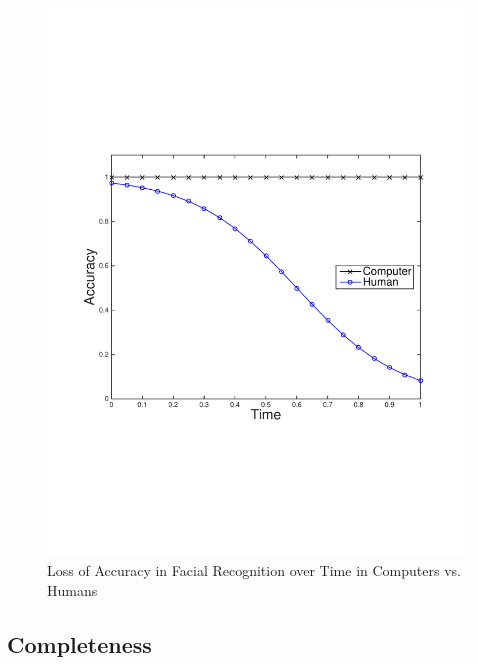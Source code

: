 \begin{figure}
\begin{centering}
    \includegraphics[clip=true, trim = 15mm 65mm 25mm 70mm, scale=0.40]{figures/example_qoi_trends/acc_vs_time_hvc_FR.pdf}
    \caption{Loss of Accuracy in Facial Recognition over Time in Computers vs. Humans }
    \label{fig:acc_vs_time_hvc_FR}
\end{centering}
\end{figure}

\subsection{Completeness}

